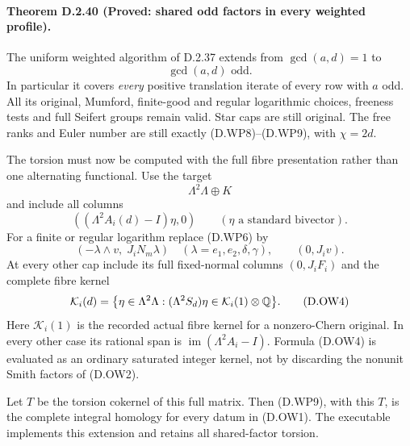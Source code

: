 \paragraph{Theorem D.2.40 (Proved: shared odd factors in every weighted profile).}
The uniform weighted algorithm of D.2.37 extends from
$\gcd(a,d)=1$ to
\[
                     \gcd(a,d)\text{ odd}.                \tag{D.OW1}
\]
In particular it covers \emph{every} positive translation
iterate of every row with $a$ odd. All its original,
Mumford, finite-good and regular logarithmic choices,
freeness tests and full Seifert groups remain valid.
Star caps are still original. The free ranks and Euler
number are still exactly (D.WP8)--(D.WP9), with
$\chi=2d$.

The torsion must now be computed with the full fibre
presentation rather than one alternating functional.
Use the target
\[
                       \Lambda^2\Lambda\oplus K
\]
and include all columns
\[
 ((\Lambda^2A_i(d)-I)\eta,0)\qquad
                  (\eta\text{ a standard bivector}).     \tag{D.OW2}
\]
For a finite or regular logarithm replace (D.WP6) by
\[
 (-\lambda\wedge v,\;J_iN_m\lambda)
       \quad(\lambda=e_1,e_2,\delta,\gamma),\qquad
                         (0,J_iv).                       \tag{D.OW3}
\]
At every other cap include its full fixed-normal
columns $(0,J_iF_i)$ and the complete fibre kernel
\[
 {\cal K}_i(d)=
 \bigl\{\eta\in\Lambda^2\Lambda:
          (\Lambda^2S_d)\eta\in
          {\cal K}_i(1)\otimes\mathbb Q\bigr\}.             \tag{D.OW4}
\]
Here $\mathcal K_i(1)$ is the recorded actual fibre kernel
for a nonzero-Chern original. In every other case its
rational span is
$\operatorname{im}(\Lambda^2A_i-I)$.
Formula (D.OW4) is evaluated as an ordinary saturated
integer kernel, not by discarding the nonunit Smith
factors of (D.OW2).

Let $T$ be the torsion cokernel of this full matrix.
Then (D.WP9), with this $T$, is the complete integral
homology for every datum in (D.OW1).
The executable 
implements this extension and retains all shared-factor
torsion.

